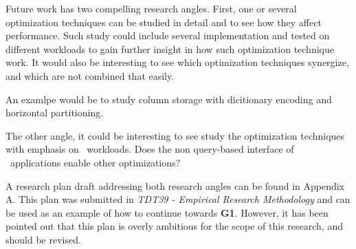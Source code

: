Future work has two compelling research angles. First, one or several optimization techniques can be studied in detail and to see how they affect performance. Such study could include several implementation and tested on different workloads to gain further insight in how such optimization technique work. It would also be interesting to see which optimization techniques synergize, and which are not combined that easily. 

An examlpe would be to study column storage with dicitionary encoding and horizontal partitioning.

The other angle, it could be interesting to see study the optimization techniques with emphasis on \bd~workloads. Does the non query-based interface of \bd~applications enable other optimizations? 


A research plan draft addressing both research angles can be found in Appendix A. This plan was submitted in \textit{TDT39 - Empirical Research Methodology} and can be used as an example of how to continue towards \textbf{G1}. However, it has been pointed out that this plan is overly ambitious for the scope of this research, and should be revised.
